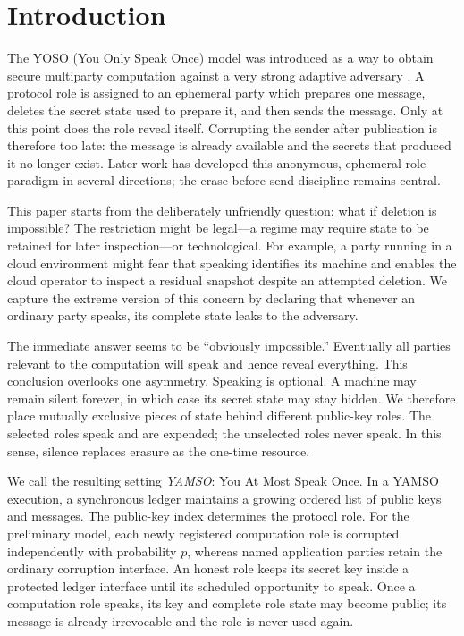 \section{Introduction}
\label{sec:introduction}

The YOSO (You Only Speak Once) model was introduced as a way to obtain secure
multiparty computation against a very strong adaptive adversary
\cite{GentryEtAl2021YOSOFull}. A protocol role is assigned to an ephemeral
party which prepares one message, deletes the secret state used to prepare
it, and then sends the message. Only at this point does the role reveal
itself. Corrupting the sender after publication is therefore too late: the
message is already available and the secrets that produced it no longer
exist. Later work has developed this anonymous, ephemeral-role paradigm in
several directions; the erase-before-send discipline remains central.

This paper starts from the deliberately unfriendly question: what if deletion
is impossible? The restriction might be legal---a regime may require state
to be retained for later inspection---or technological. For example, a
party running in a cloud environment might fear that speaking identifies its
machine and enables the cloud operator to inspect a residual snapshot despite
an attempted deletion. We capture the extreme version of this concern by
declaring that whenever an ordinary party speaks, its complete state leaks to
the adversary.

The immediate answer seems to be ``obviously impossible.'' Eventually all
parties relevant to the computation will speak and hence reveal everything.
This conclusion overlooks one asymmetry. Speaking is optional. A machine may
remain silent forever, in which case its secret state may stay hidden. We
therefore place mutually exclusive pieces of state behind different
public-key roles. The selected roles speak and are expended; the unselected
roles never speak. In this sense, silence replaces erasure as the one-time
resource.

We call the resulting setting \emph{YAMSO}: You At Most Speak Once. In a
YAMSO execution, a synchronous ledger maintains a growing ordered list of
public keys and messages. The public-key index determines the protocol role.
For the preliminary model, each newly registered computation role is corrupted
independently with probability $p$, whereas named application parties retain
the ordinary corruption interface. An honest role keeps its secret key inside
a protected ledger interface until its scheduled opportunity to speak. Once a
computation role speaks, its key and complete role state may become public;
its message is already irrevocable and the role is never used again.

